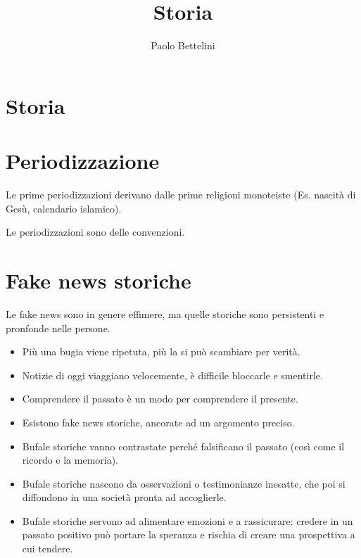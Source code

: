 \documentclass[a4paper]{article}
\title{Storia}
\author{Paolo Bettelini}
\date{}
\begin{document}
\maketitle
\tableofcontents
\pagebreak


\section{Storia}


\section{Periodizzazione}


Le prime periodizzazioni derivano dalle prime religioni monoteiste (Es. nascità di Gesù, calendario islamico).

Le periodizzazioni sono delle convenzioni.

\section{Fake news storiche}


Le fake news sono in genere effimere, ma quelle storiche sono persistenti e
pronfonde nelle persone.

\begin{itemize}
    \item Più una bugia viene ripetuta, più la si può scambiare per verità.
    \item Notizie di oggi viaggiano velocemente, è difficile bloccarle e smentirle.
    \item Comprendere il passato è un modo per comprendere il presente.
    \item Esistono fake news storiche, ancorate ad un argomento preciso.
    \item Bufale storiche vanno contrastate perché falsificano il passato (così come il ricordo e la memoria).
    \item Bufale storiche nascono da osservazioni o testimonianze inesatte, che poi si diffondono in una società pronta ad accoglierle.
    \item Bufale storiche servono ad alimentare emozioni e a rassicurare: credere in un passato positivo può portare la speranza e rischia di creare una prospettiva a cui tendere.
\end{itemize}
\end{document}
